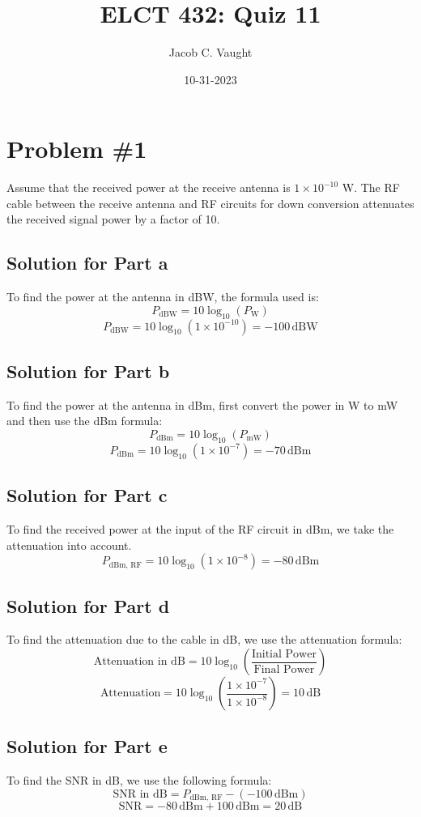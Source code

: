 \documentclass{article}
\begin{document}
\title{ELCT 432: Quiz 11}
\author{Jacob C. Vaught}
\date{10-31-2023}
\maketitle
\section*{Problem \#1}
Assume that the received power at the receive antenna is \(1 \times 10^{-10}\) W. 
The RF cable between the receive antenna and RF circuits for down conversion attenuates 
the received signal power by a factor of 10.

\subsection*{Solution for Part a}
To find the power at the antenna in dBW, the formula used is:
\[
P_{\text{dBW}} = 10 \log_{10}(P_{\text{W}})
\]
\[
P_{\text{dBW}} = 10 \log_{10}(1 \times 10^{-10}) = -100 \, \text{dBW}
\]

\subsection*{Solution for Part b}
To find the power at the antenna in dBm, first convert the power in W to mW and then use the dBm formula:
\[
P_{\text{dBm}} = 10 \log_{10}(P_{\text{mW}})
\]
\[
P_{\text{dBm}} = 10 \log_{10}(1 \times 10^{-7}) = -70 \, \text{dBm}
\]

\subsection*{Solution for Part c}
To find the received power at the input of the RF circuit in dBm, we take the attenuation into account.
\[
P_{\text{dBm, RF}} = 10 \log_{10}(1 \times 10^{-8}) = -80 \, \text{dBm}
\]

\subsection*{Solution for Part d}
To find the attenuation due to the cable in dB, we use the attenuation formula:
\[
\text{Attenuation in dB} = 10 \log_{10}\left(\frac{\text{Initial Power}}{\text{Final Power}}\right)
\]
\[
\text{Attenuation} = 10 \log_{10}\left(\frac{1 \times 10^{-7}}{1 \times 10^{-8}}\right) = 10 \, \text{dB}
\]

\subsection*{Solution for Part e}
To find the SNR in dB, we use the following formula:
\[
\text{SNR in dB} = P_{\text{dBm, RF}} - (-100 \, \text{dBm})
\]
\[
\text{SNR} = -80 \, \text{dBm} + 100 \, \text{dBm} = 20 \, \text{dB}
\]
\end{document}
